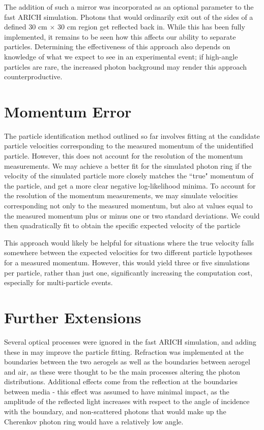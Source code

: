 The addition of such a mirror was incorporated as an optional parameter to the fast ARICH simulation.
Photons that would ordinarily exit out of the sides of a defined 30 cm $\times$ 30 cm region get reflected back in.
While this has been fully implemented, it remains to be seen how this affects our ability to separate particles.
Determining the effectiveness of this approach also depends on knowledge of what we expect to see in an experimental event; if high-angle particles are rare, the increased photon background may render this approach counterproductive.

\section{Momentum Error}
The particle identification method outlined so far involves fitting at the candidate particle velocities corresponding to the measured momentum of the unidentified particle.
However, this does not account for the resolution of the momentum measurements.
We may achieve a better fit for the simulated photon ring if the velocity of the simulated particle more closely matches the ``true" momentum of the particle, and get a more clear negative log-likelihood minima. 
To account for the resolution of the momentum measurements, we may simulate velocities corresponding not only to the measured momentum, but also at values equal to the measured momentum plus or minus one or two standard deviations.
We could then quadratically fit to obtain the specific expected velocity of the particle

This approach would likely be helpful for situations where the true velocity falls somewhere between the expected velocities for two different particle hypotheses for a measured momentum.  
However, this would yield three or five simulations per particle, rather than just one, significantly increasing the computation cost, especially for multi-particle events. 

\section{Further Extensions}
Several optical processes were ignored in the fast ARICH simulation, and adding these in may improve the particle fitting. 
Refraction was implemented at the boundaries between the two aerogels as well as the boundaries between aerogel and air, as these were thought to be the main processes altering the photon distributions.
Additional effects come from the reflection at the boundaries between media - this effect was assumed to have minimal impact, as the amplitude of the reflected light increases with respect to the angle of incidence with the boundary, and non-scattered photons that would make up the Cherenkov photon ring would have a relatively low angle.

